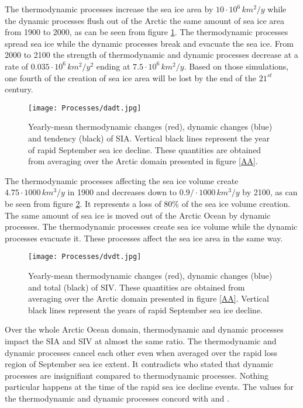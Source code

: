 The thermodynamic processes increase the sea ice area by $10 \cdot10^6 \, km^2/y$ while the dynamic processes flush out of the Arctic the same amount of sea ice area from 1900 to 2000, as can be seen from figure \ref{daidt}. The thermodynamic processes spread sea ice while the dynamic processes break and evacuate the sea ice. From 2000 to 2100 the strength of thermodynamic and dynamic processes decrease at a rate of $0.035 \cdot10^6 \, km^2/y^2$ ending at $7.5 \cdot10^6 \, km^2/y$. Based on those simulations, one fourth of the creation of sea ice area will be lost by the end of the $21^{st}$ century. 

\begin{figure}[t!]
\center
\noindent\texttt{[image: Processes/dadt.jpg]}
\caption{Yearly-mean thermodynamic changes (red), dynamic changes (blue) and tendency (black) of SIA. Vertical black lines represent the year of rapid September sea ice decline. These quantities are obtained from averaging over the Arctic domain presented in figure \ref{AA}.}
\label{daidt}
\end{figure}

The thermodynamic processes affecting the sea ice volume create $4.75 \cdot1000 \, km^3/y$ in 1900 and decreases down to $0.9/ \cdot1000 \, km^3/y$ by 2100, as can be seen from figure \ref{dvidt}. It represents a loss of $80\%$ of the sea ice volume creation. The same amount of sea ice is moved out of the Arctic Ocean by dynamic processes. The thermodynamic processes create sea ice volume while the dynamic processes evacuate it. These processes affect the sea ice area in the same way.

\begin{figure}[t!]
\center
\noindent\texttt{[image: Processes/dvdt.jpg]}
\caption{Yearly-mean thermodynamic changes (red), dynamic changes (blue) and total (black) of SIV. These quantities are obtained from averaging over the Arctic domain presented in figure \ref{AA}. Vertical black lines represent the years of rapid September sea ice decline.}
\label{dvidt}
\end{figure}


Over the whole Arctic Ocean domain, thermodynamic and dynamic processes impact the SIA and SIV at almost the same ratio. The thermodynamic and dynamic processes cancel each other even when averaged over the rapid loss region of September sea ice extent. It contradicts \cite{ISI:000242942100008} who stated that dynamic processes are insignifiant compared to thermodynamic processes. Nothing particular happens at the time of the rapid sea ice decline events. The values for the thermodynamic and dynamic processes concord with \cite{Serreze2007} and \cite{Holland2010}. 



